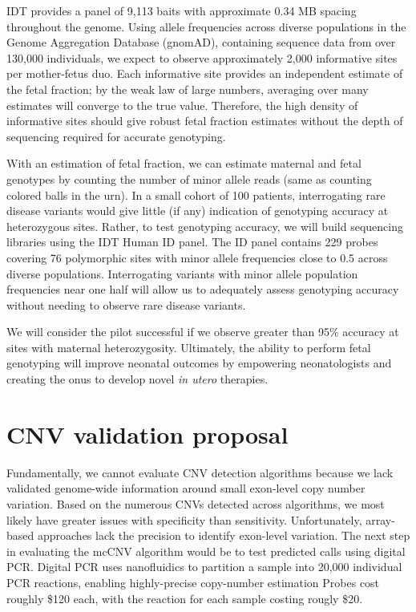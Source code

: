 \documentclass[11pt,letterpaper]{book}
\begin{document}
IDT provides a panel of 9,113 baits with approximate 0.34 MB spacing throughout the genome.
Using allele frequencies across diverse populations in the Genome Aggregation Database (gnomAD), containing sequence data from over 130,000 individuals, we expect to observe approximately 2,000 informative sites per mother-fetus duo.
Each informative site provides an independent estimate of the fetal fraction; by the weak law of large numbers, averaging over many estimates will converge to the true value.
Therefore, the high density of informative sites should give robust fetal fraction estimates without the depth of sequencing required for accurate genotyping.

With an estimation of fetal fraction, we can estimate maternal and fetal genotypes by counting the number of minor allele reads (same as counting colored balls in the urn).
In a small cohort of 100 patients, interrogating rare disease variants would give little (if any) indication of genotyping accuracy at heterozygous sites.
Rather, to test genotyping accuracy, we will build sequencing libraries using the IDT Human ID panel.
The ID panel contains 229 probes covering 76 polymorphic sites with minor allele frequencies close to 0.5 across diverse populations.
Interrogating variants with minor allele population frequencies near one half will allow us to adequately assess genotyping accuracy without needing to observe rare disease variants.

We will consider the pilot successful if we observe greater than 95\% accuracy at sites with maternal heterozygosity.
Ultimately, the ability to perform fetal genotyping will improve neonatal outcomes by empowering neonatologists and creating the onus to develop novel \emph{in utero} therapies.

\hypertarget{cnv-validation-proposal}{%
\section{CNV validation proposal}\label{cnv-validation-proposal}}

Fundamentally, we cannot evaluate CNV detection algorithms because we lack validated genome-wide information around small exon-level copy number variation.
Based on the numerous CNVs detected across algorithms, we most likely have greater issues with specificity than sensitivity.
Unfortunately, array-based approaches lack the precision to identify exon-level variation.
The next step in evaluating the mcCNV algorithm would be to test predicted calls using digital PCR.
Digital PCR uses nanofluidics to partition a sample into 20,000 individual PCR reactions, enabling highly-precise copy-number estimation
Probes cost roughly \$120 each, with the reaction for each sample costing rougly \$20.
\end{document}
